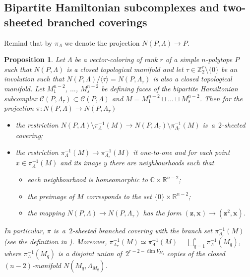 \documentclass[12pt]{amsart}
\newtheorem{proposition}[formula]{Proposition}
\theoremstyle{definition}
\theoremstyle{remark}
\begin{document}
\subsection{Bipartite Hamiltonian subcomplexes and two-sheeted branched coverings}\label{ssec:bc}
Remind that by $\pi_{\Lambda}$ we denote the projection $N(P,\Lambda)\to P$.
\begin{proposition}\label{prop:Ham2sh}
Let $\Lambda$ be a vector-coloring of rank $r$ of a simple $n$-polytope $P$ such
that $N(P,\Lambda)$ is a closed topological manifold and let 
$\tau\in\mathbb Z_2^r\setminus\{0\}$ be an involution such that 
$N(P,\Lambda)/\langle\tau\rangle=N(P,\Lambda_\tau)$ is also a closed topological manifold.
Let $M_1^{n-2}$, $\dots$, $M_s^{n-2}$ be defining faces of the bipartite Hamiltonian subcomplex 
$\mathcal{C}(P,\Lambda_\tau)\subset\mathcal{C}(P,\Lambda)$ and $M=M_1^{n-2}\sqcup\dots\sqcup M_s^{n-2}$. 
Then for the projection \linebreak $\pi\colon N(P,\Lambda)\to N(P,\Lambda_\tau)$ 
\begin{itemize}
\item the restriction $N(P,\Lambda)\setminus \pi_{\Lambda}^{-1}(M)\to 
N(P,\Lambda_\tau)\setminus\pi_{\Lambda_\tau}^{-1}(M)$ is~a~$2$-sheeted covering;
\item the restriction $\pi_{\Lambda}^{-1}(M)\to\pi_{\Lambda_\tau}^{-1}(M)$ it one-to-one
and for each point $x\in \pi_{\Lambda}^{-1}(M)$ and its image $y$
there are neighbourhoods such that
\begin{itemize}
\item each neighbourhood is homeomorphic to $\mathbb C\times\mathbb R^{n-2}$;
\item the preimage of $M$ corresponds to the set $\{0\}\times \mathbb R^{n-2}$;
\item the mapping $N(P,\Lambda)\to N(P,\Lambda_\tau)$ has the form 
$(\boldsymbol{z},\boldsymbol{x})\to (\boldsymbol{z}^2,\boldsymbol{x})$.
\end{itemize}
\end{itemize}
In particular, $\pi$ is~a~$2$-sheeted branched  covering with the branch set 
$\pi_{\Lambda_\tau}^{-1}(M)$ (see the definition in \cite{G19}). 
Moreover, $\pi_{\Lambda_\tau}^{-1}(M)\simeq \pi_{\Lambda}^{-1}(M)=
\bigsqcup\limits_{q=1}^s\pi_{\Lambda}^{-1}(M_q)$, where 
$\pi_{\Lambda}^{-1}(M_q)$ is a disjoint union of~$2^{r-2-\dim V_{M_q}}$ copies of the closed $(n-2)$-manifold 
$N(M_q,\Lambda_{M_q})$.
\end{proposition}
\end{document}
